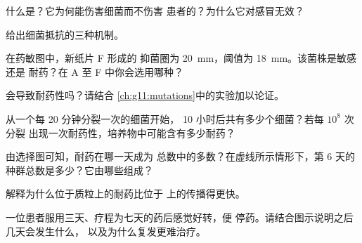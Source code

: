 \begin{exercise}[$\star$]\label{exo:g11:antibiotic-resistance:2}
什么是？它为何能伤害细菌而不伤害
患者的？为什么它对感冒无效？
\end{exercise}

\begin{exercise}[$\star$]\label{exo:g11:antibiotic-resistance:3}
给出细菌抵抗的三种机制。
\end{exercise}

\begin{exercise}[$\star$]\label{exo:g11:antibiotic-resistance:4}
在药敏图中，新纸片 F 形成的
抑菌圈为 \qty{20}{mm}，阈值为 \qty{18}{mm}。该菌株是敏感还是
耐药？在 A 至 F 中你会选用哪种？
\end{exercise}

\begin{exercise}[$\star$]\label{exo:g11:antibiotic-resistance:5}
会导致耐药性吗？请结合
\cref{ch:g11:mutations}中的实验加以论证。
\end{exercise}

\begin{exercise}[$\star\star$]\label{exo:g11:antibiotic-resistance:6}
从一个每 20 分钟分裂一次的细菌开始，
10 小时后共有多少个细菌？若每 $10^8$ 次分裂
出现一次耐药性，培养物中可能含有多少耐药？
\end{exercise}

\begin{exercise}[$\star\star$]\label{exo:g11:antibiotic-resistance:7}
由选择图可知，耐药在哪一天成为
总数中的多数？在虚线所示情形下，第 6 天的
种群总数是多少？它由哪些组成？
\end{exercise}

\begin{exercise}[$\star\star$]\label{exo:g11:antibiotic-resistance:8}
解释为什么位于质粒上的耐药比位于
上的传播得更快。
\end{exercise}

\begin{exercise}[$\star\star$]\label{exo:g11:antibiotic-resistance:9}
一位患者服用三天、疗程为七天的药后感觉好转，便
停药。请结合图示说明之后几天会发生什么，
以及为什么复发更难治疗。
\end{exercise}


